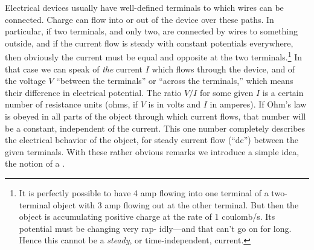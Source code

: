 Electrical devices usually have well-defined terminals to which
wires can be connected. Charge can flow into or out of the device
over these paths. In particular, if two terminals, and only two, are
connected by wires to something outside, and if the current flow is
steady with constant potentials everywhere, then obviously the current
must be equal and opposite at the 
two terminals.\footnote{It is perfectly possible to have 4 amp flowing into one terminal of a two-terminal
object with 3 amp flowing out at the other terminal. But then the object is accumulating
positive charge at the rate of 1 coulomb/s. Its potential must be changing very rap-
idly---and that can't go on for long. Hence this cannot be a \emph{steady}, or time-independent,
current.} In that case
we can speak of \emph{the} current $I$ which flows through the device, and of
the voltage $V$ ``between the terminals'' or ``across the terminals,''
which means their difference in electrical potential. The ratio $V/I$ for
some given $I$ is a certain number of resistance units (ohms, if $V$ is in
volts and $I$ in amperes). If Ohm's law is obeyed in all parts of the
object through which current flows, that number will be a constant,
independent of the current. This one number completely describes
the electrical behavior of the object, for steady current flow (``dc'')
between the given terminals. With these rather obvious remarks we
introduce a simple idea, the notion of a .


